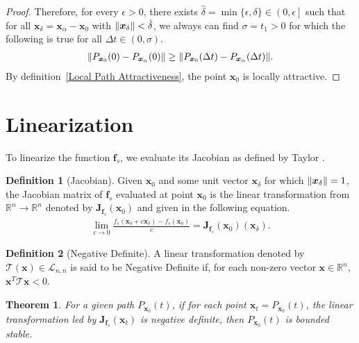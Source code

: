 \documentclass{article}
\newcommand{\B}[1]{\boldsymbol{#1}}
\DeclarePairedDelimiter\norm{\lVert}{\rVert}%
\newtheorem{theorem}{Theorem}[section]
\theoremstyle{definition}
\newtheorem{definition}{Definition}[section]
\theoremstyle{remark}
\begin{document}
\begin{proof}
  Therefore, for every $\epsilon > 0$, there exists $\hat{\delta} = \min\{\epsilon, \delta\} \in \left(0, \epsilon\right]$ such that
  for all $\B{x}_\delta = \B{x}_\alpha - \B{x}_0$ with $\norm{\B{x}_\delta} < \hat{\delta}$,
  we always can find $\sigma = t_1 > 0$ for which the following is true for all $\Delta t \in \left(0, \sigma\right)$.  
  \begin{align}
  \norm{P_{\B{x}_0}(0) - P_{\B{x}_\alpha}(0)} \geq \norm{P_{\B{x}_0}(\Delta t) - P_{\B{x}_\alpha}(\Delta t)}.
  \end{align}
  By definition~\ref{Local Path Attractiveness}, the point $\B{x}_0$ is locally attractive.
\end{proof}

\section{Linearization}
To linearize the function $\B{f}_s$, we evaluate its Jacobian as defined by Taylor \cite{AdvancedCalculus}.
\begin{definition}[Jacobian]
  \label{Jacobian Approximation}
  Given $\B{x}_0$ and some unit vector $\B{x}_\delta$ for which $\norm{\B{x}_\delta} = 1$,
  the Jacobian matrix of $\B{f}_s$ evaluated at point $\B{x}_0$ is the linear transformation 
  from $\mathbb{R}^n \to \mathbb{R}^n$
  denoted by $\B{J}_{\B{f}_s}(\B{x}_0)$ and given in the following equation.
  \begin{align}
  \lim_{c \to 0} \frac{f_s(\B{x}_0 + c \B{x}_\delta) - f_s(\B{x}_0)}{c} = \B{J}_{\B{f}_s}(\B{x}_0)(\B{x}_\delta).\label{jacobian}
  \end{align}
\end{definition}
\begin{definition}[Negative Definite]
  \label{Negative Definite}
  A linear transformation denoted by \\
  $\mathscr{T}(\B{x}) \in \mathcal{L}_{n,n}$ is said to be Negative Definite \cite{LinearAlgebra}
  if, for each non-zero vector $\B{x} \in \mathbb{R}^n$, $\B{x}^T \mathscr{T}\B{x} < 0$.
\end{definition}
\begin{theorem}
  \label{Negative Definite Path Stability}
  For a given path $P_{\B{x}_0}(t)$, if for each point $\B{x}_t = P_{\B{x}_0}(t)$,
  the linear transformation led by $\B{J}_{\B{f}_s}(\B{x}_t)$
  is negative definite, then $P_{\B{x}_0}(t)$ is bounded stable.
\end{theorem}
\end{document}
